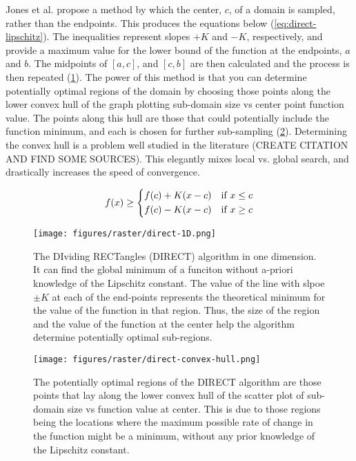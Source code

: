Jones et al. \cite{jonesLipschitzianOptimizationLipschitz1993} propose a method by which the center, $c$, of a domain is sampled, rather than the endpoints. This produces the equations below (\cref{eq:direct-lipschitz}). The inequalities represent slopes $+K$ and $-K$, respectively, and provide a maximum value for the lower bound of the function at the endpoints, $a$ and $b$. The midpoints of $[a,c]$, and $[c,b]$ are then calculated and the process is then repeated (\cref{fig:direct-1D}). The power of this method is that you can determine potentially optimal regions of the domain by choosing those points along the lower convex hull of the graph plotting sub-domain size vs center point function value. The points along this hull are those that could potentially include the function minimum, and each is chosen for further sub-sampling (\cref{fig:direct-convex-hull}). Determining the convex hull is a problem well studied in the literature (CREATE CITATION AND FIND SOME SOURCES). This elegantly mixes local vs. global search, and drastically increases the speed of convergence.


\begin{equation}
    f(x) \ge \begin{dcases}
        f(c) + K(x-c) & \text{if  } x \le c \\
        f(c) - K(x-c) & \text{if  } x \ge c
    \end{dcases}
    \label{eq:direct-lipschitz}
\end{equation}

\begin{figure}[h!]
    \begin{center}
        \texttt{[image: figures/raster/direct-1D.png]}
    \end{center}
    \caption{The DIviding RECTangles (DIRECT) algorithm in one dimension. It can find the global minimum of a funciton without a-priori knowledge of the Lipschitz constant. The value of the line with slpoe $\pm K$ at each of the end-points represents the theoretical minimum for the value of the function in that region. Thus, the size of the region and the value of the function at the center help the algorithm determine potentially optimal sub-regions.}
    \label{fig:direct-1D}
\end{figure}

\begin{figure}[h!]
    \begin{center}
        \texttt{[image: figures/raster/direct-convex-hull.png]}
    \end{center}
    \caption{The potentially optimal regions of the DIRECT algorithm are those points that lay along the lower convex hull of the scatter plot of sub-domain size vs function value at center. This is due to those regions being the locations where the maximum possible rate of change in the function might be a minimum, without any prior knowledge of the Lipschitz constant.}
    \label{fig:direct-convex-hull}
\end{figure}

